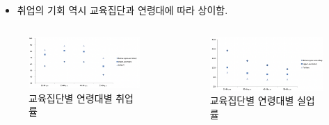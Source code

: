 \documentclass[aspectratio=169,xcolor=dvipsnames,handout]{beamer}
\begin{document}
\begin{frame}{}
    \begin{itemize}
        \item 취업의 기회 역시 교육집단과 연령대에 따라 상이함.
    \end{itemize}
\begin{columns}
    \begin{column}{.5\textwidth}
        \begin{figure}
            \centering
            \includegraphics[scale=.3]{pic/tpin2.7a.png}
            \caption{교육집단별 연령대별 취업률}
        \end{figure}
    \end{column}    
    \begin{column}{.5\textwidth}
        \begin{figure}
            \centering
            \includegraphics[scale=.3]{pic/tpin2.7.png}
            \caption{교육집단별 연령대별 실업률}
        \end{figure}
    \end{column}    
\end{columns}
\end{frame}
\end{document}
